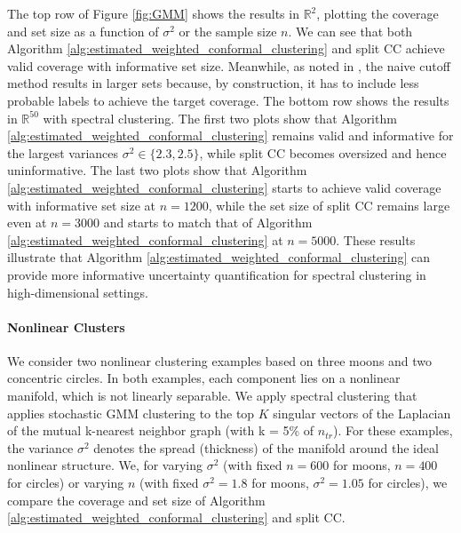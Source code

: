 \documentclass[11pt,letterpaper]{article}
\theoremstyle{definition}
\newcommand{\R}{\mathbb{R}}
\begin{document}
The top row of Figure \ref{fig:GMM} shows the results in \(\R^2\), plotting the coverage and set size as a function of \(\sigma^2\) or the sample size \(n\). We can see that both Algorithm \ref{alg:estimated_weighted_conformal_clustering} and split CC achieve valid coverage with informative set size. Meanwhile, as noted in \cite{hur2026inference}, the naive cutoff method results in larger sets because, by construction, it has to include less probable labels to achieve the target coverage. The bottom row shows the results in \(\R^{50}\) with spectral clustering. The first two plots show that Algorithm \ref{alg:estimated_weighted_conformal_clustering} remains valid and informative for the largest variances $\sigma^2 \in \{2.3, 2.5\}$, while split CC becomes oversized and hence uninformative. The last two plots show that Algorithm \ref{alg:estimated_weighted_conformal_clustering} starts to achieve valid coverage with informative set size at \(n = 1200\), while the set size of split CC remains large even at \(n = 3000\) and starts to match that of Algorithm \ref{alg:estimated_weighted_conformal_clustering} at \(n = 5000\). These results illustrate that Algorithm \ref{alg:estimated_weighted_conformal_clustering} can provide more informative uncertainty quantification for spectral clustering in high-dimensional settings.


\paragraph{Nonlinear Clusters} We consider two nonlinear clustering examples based on three moons and two concentric circles. In both examples, each component lies on a nonlinear manifold, which is not linearly separable. We apply spectral clustering that applies stochastic GMM clustering to the top \(K\) singular vectors of the Laplacian of the mutual k-nearest neighbor graph (with k = 5\% of \(n_{tr}\)). For these examples, the variance \(\sigma^2\) denotes the spread (thickness) of the manifold around the ideal nonlinear structure. We, for varying \(\sigma^2\) (with fixed \(n = 600\) for moons, \(n = 400\) for circles) or varying \(n\) (with fixed \(\sigma^2 = 1.8\) for moons, \(\sigma^2 = 1.05\) for circles), we compare the coverage and set size of Algorithm \ref{alg:estimated_weighted_conformal_clustering} and split CC.
\end{document}
